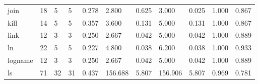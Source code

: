\begin{longtable}{lp{1.8cm}p{1.8cm}p{1.8cm}p{1.8cm}p{1.8cm}p{1.8cm}p{1.8cm}p{1.8cm}p{1.8cm}p{1.8cm}}
join      &                           18 &                  5 &                                 5 &                                      0.278 &                                  2.800 &                                        0.625 &                             3.000 &                                   0.025 &                              1.000 &                                              0.867 \\
kill      &                           14 &                  5 &                                 5 &                                      0.357 &                                  3.600 &                                        0.131 &                             5.000 &                                   0.131 &                              1.000 &                                              0.867 \\
link      &                           12 &                  3 &                                 3 &                                      0.250 &                                  2.667 &                                        0.042 &                             5.000 &                                   0.042 &                              1.000 &                                              0.889 \\
ln        &                           22 &                  5 &                                 5 &                                      0.227 &                                  4.800 &                                        0.038 &                             6.200 &                                   0.038 &                              1.000 &                                              0.933 \\
logname   &                           12 &                  3 &                                 3 &                                      0.250 &                                  2.667 &                                        0.042 &                             5.000 &                                   0.042 &                              1.000 &                                              0.889 \\
ls        &                           71 &                 32 &                                31 &                                      0.437 &                                156.688 &                                        5.807 &                           156.906 &                                   5.807 &                              0.969 &                                              0.781 \\

\end{longtable}
